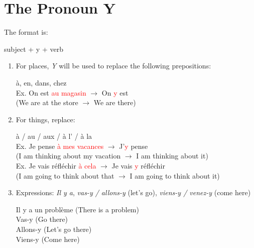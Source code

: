 \documentclass{book}
\begin{document}
    \section{The Pronoun Y}
        The format is:
            \begin{center}
                subject + y + verb
            \end{center}
        \begin{enumerate}
            \item For places, \textit{Y} will be used to replace the following prepositions:
                \begin{center}
                    à, en, dans, chez \\
                    Ex. On est \textcolor{red}{au magasin} $\to$ On \textcolor{red}{y} est \\
                    (We are at the store $\to$ We are there)
                \end{center}
            \item For things, replace:
                \begin{center}
                    à / au / aux / à l' / à la \\
                    Ex. Je pense \textcolor{red}{à mes vacances} $\to$ J'\textcolor{red}{y} pense \\
                    (I am thinking about my vacation $\to$ I am thinking about it) \\
                    Ex. Je vais réfléchir \textcolor{red}{à cela} $\to$ Je vais \textcolor{red}{y} réfléchir \\
                    (I am going to think about that $\to$ I am going to think about it)
                \end{center}
            \item Expressions: \textit{Il y a}, \textit{vas-y / allons-y} (let's go), \textit{viens-y / venez-y} (come here)
                \begin{center}
                    Il y a un problème (There is a problem) \\
                    Vas-y (Go there) \\
                    Allons-y (Let's go there) \\
                    Viens-y (Come here)
                \end{center}
        \end{enumerate}
\end{document}
